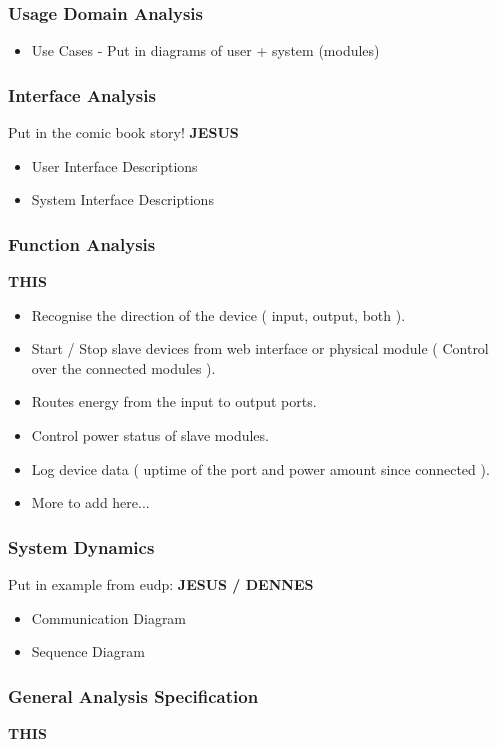 	\subsubsection{Usage Domain Analysis}
		\begin{itemize}
			\item Use Cases - Put in diagrams of user + system (modules)
		\end{itemize}
	\subsubsection{Interface Analysis}
			Put in the comic book story!  \textbf{JESUS}
		\begin{itemize}
			\item User Interface Descriptions
				
			\item System Interface Descriptions
		\end{itemize}
	\subsubsection{Function Analysis}
	 \textbf{THIS}
		\begin{itemize}
			\item Recognise the direction of the device ( input, output, both ).
			\item Start / Stop slave devices from web interface or physical module ( Control over the connected modules ).
			\item Routes energy from the input to output ports.
			\item Control power status of slave modules.
			\item Log device data ( uptime of the port and power amount since connected ).
			\item More to add here...
		\end{itemize}
	\subsubsection{System Dynamics}
			Put in example from eudp: %
			 \textbf{JESUS / DENNES}
		\begin{itemize}
			\item Communication Diagram
			\item Sequence Diagram
		\end{itemize}
	\subsubsection{General Analysis Specification}
		 \textbf{THIS}
